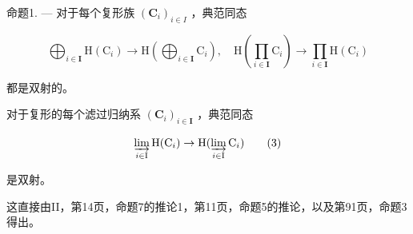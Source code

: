命题1. --- 对于每个复形族 \((\mathbf{C}_{i})_{i\in I}\) ，典范同态

\[
\bigoplus_ {i \in \mathbf {I}} \mathrm{H} (\mathrm{C} _ {i}) \rightarrow \mathrm{H} \left(\bigoplus_ {i \in \mathbf {I}} \mathrm{C} _ {i}\right), \quad \mathrm{H} \left(\prod_ {i \in \mathbf {I}} \mathrm{C} _ {i}\right)\rightarrow \prod_ {i \in \mathbf {I}} \mathrm{H} (\mathrm{C} _ {i})\tag{2}
\]

都是双射的。

对于复形的每个滤过归纳系 \((\mathbf{C}_{i})_{i\in\mathbf{I}}\) ，典范同态

\[
\varinjlim_ {i \in \mathrm{I}} \mathrm{H} (\mathrm{C} _ {i}) \to \mathrm{H} (\varinjlim_ {i \in \mathrm{I}} \mathrm{C} _ {i})\tag{3}
\]

是双射。

这直接由II，第14页，命题7的推论1，第11页，命题5的推论，以及第91页，命题3得出。

